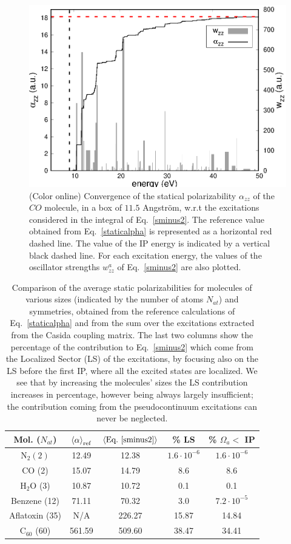 \documentclass[reprint,aps,prb]{revtex4-1}
\renewcommand{\AA}{{Angstr\"om}}
\begin{document}
\begin{figure}
\includegraphics[scale=0.6]{Fig6_CO_statPolvsExc.eps}
\caption{\label{co_AlphaExc}(Color online) Convergence of the statical polarizability $\alpha_{zz}$ of the $CO$ molecule, in a box of $11.5$ \AA,
w.r.t the excitations considered in the integral of Eq.~\eqref{sminus2}. The reference value obtained from Eq.~\eqref{staticalpha} is represented as a
horizontal red dashed line. The value of the IP energy is indicated by a vertical black dashed line. For each excitation energy, the values of the
oscillator strengths $w^a_{zz}$ of Eq.~\eqref{sminus2} are also plotted. }
\end{figure}

\begin{table}
\begin{tabular}{c|cc||cc}
  Mol. ($N_{at}$) & $\braket{\alpha}_\text{ref}$ & $ \braket{\text{Eq.~\eqref{sminus2}}}$ & \% LS & \% $\Omega_a <$ IP  \\
  \hline
  \hline
  N$_2 (2)$ &12.49 & 12.38 & $1.6\cdot 10^{-6}$ & $1.6\cdot 10^{-6}$ \\
  CO (2)& 15.07 & 14.79 & 8.6 & 8.6 \\
  H$_2$O (3) & 10.87 & 10.72 & 0.1 & 0.1 \\
  Benzene (12)& 71.11 & 70.32 & 3.0 & $7.2 \cdot 10^{-5}$\\
  Aflatoxin (35)& N/A   & 226.27 & 15.87 & 14.84 \\
  C$_{60}$ (60)& 561.59 & 509.60 & 38.47 & 34.41
\end{tabular}\caption{Comparison of the average static polarizabilities for molecules of various sizes (indicated by the number of atoms $N_{at}$) and symmetries, obtained from the reference calculations of Eq.~\eqref{staticalpha} and from the sum over the excitations extracted from the Casida coupling matrix. The last two columns show the percentage of the contribution to Eq.~\eqref{sminus2} which
come from the Localized Sector (LS) of the excitations, by focusing also on the LS before the first IP, where all the excited states are localized. We see that by increasing the molecules' sizes the LS contribution increases in percentage, however being always largely insufficient; the contribution coming from the pseudocontinuum excitations can never be neglected.}
\label{alphaTable}
\end{table}
\end{document}
